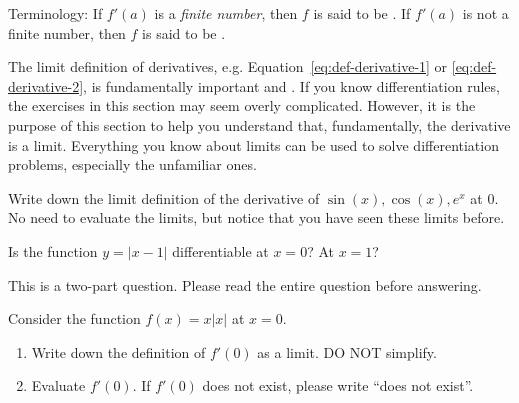 \documentclass[../main.tex]{subfiles}
\begin{document}

Terminology: If \(f'(a)\) is a \emph{finite number}, then \(f\) is said to be . If \(f'(a)\) is not a finite number, then \(f\) is said to be .
\clearpage

The limit definition of derivatives, e.g. Equation~\eqref{eq:def-derivative-1} or \eqref{eq:def-derivative-2}, is fundamentally important and . If you know differentiation rules, the exercises in this section may seem overly complicated. However, it is the purpose of this section to help you understand that, fundamentally, the derivative is a limit. Everything you know about limits can be used to solve differentiation problems, especially the unfamiliar ones.  \label{comment:derivative-definition}

\begin{example}
  Write down the limit definition of the derivative of \(\sin(x), \cos(x), e^{x}\) at \(0\). No need to evaluate the limits, but notice that you have seen these limits before.

\end{example}

\begin{example} \label{eg:derivative-absolute-value}
  Is the function \(y = |x - 1|\) differentiable at \(x = 0\)? At \(x = 1\)?

  \blanks*
\end{example}

\clearpage
\begin{exercise} \label{ex:midterm-f2025-derivative-at-a-point}
  This is a two-part question. Please read the entire question before answering.

  Consider the function \(f(x) = x|x|\) at \(x = 0\).

  \begin{enumerate}
    \item Write down the definition of \(f'(0)\) as a limit. DO NOT simplify.


    \item Evaluate \(f'(0)\). If \(f'(0)\) does not exist, please write \enquote{does not exist}.

  \end{enumerate}

\end{exercise}
\end{document}
